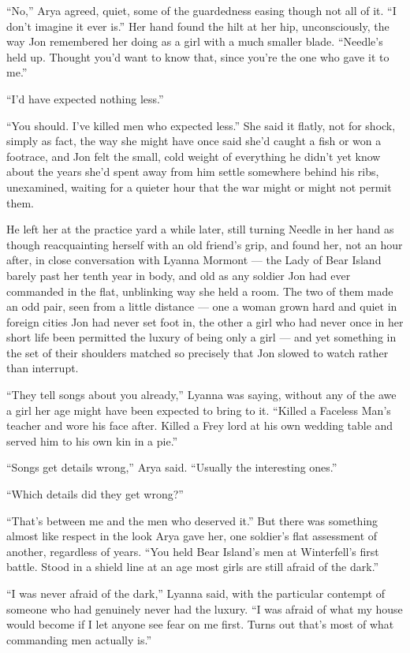 “No,” Arya agreed, quiet, some of the guardedness easing though not all of it. “I don’t imagine it ever is.” Her hand found the hilt at her hip, unconsciously, the way Jon remembered her doing as a girl with a much smaller blade. “Needle’s held up. Thought you’d want to know that, since you’re the one who gave it to me.”

“I’d have expected nothing less.”

“You should. I’ve killed men who expected less.” She said it flatly, not for shock, simply as fact, the way she might have once said she’d caught a fish or won a footrace, and Jon felt the small, cold weight of everything he didn’t yet know about the years she’d spent away from him settle somewhere behind his ribs, unexamined, waiting for a quieter hour that the war might or might not permit them.

He left her at the practice yard a while later, still turning Needle in her hand as though reacquainting herself with an old friend’s grip, and found her, not an hour after, in close conversation with Lyanna Mormont — the Lady of Bear Island barely past her tenth year in body, and old as any soldier Jon had ever commanded in the flat, unblinking way she held a room. The two of them made an odd pair, seen from a little distance — one a woman grown hard and quiet in foreign cities Jon had never set foot in, the other a girl who had never once in her short life been permitted the luxury of being only a girl — and yet something in the set of their shoulders matched so precisely that Jon slowed to watch rather than interrupt.

“They tell songs about you already,” Lyanna was saying, without any of the awe a girl her age might have been expected to bring to it. “Killed a Faceless Man’s teacher and wore his face after. Killed a Frey lord at his own wedding table and served him to his own kin in a pie.”

“Songs get details wrong,” Arya said. “Usually the interesting ones.”

“Which details did they get wrong?”

“That’s between me and the men who deserved it.” But there was something almost like respect in the look Arya gave her, one soldier’s flat assessment of another, regardless of years. “You held Bear Island’s men at Winterfell’s first battle. Stood in a shield line at an age most girls are still afraid of the dark.”

“I was never afraid of the dark,” Lyanna said, with the particular contempt of someone who had genuinely never had the luxury. “I was afraid of what my house would become if I let anyone see fear on me first. Turns out that’s most of what commanding men actually is.”

